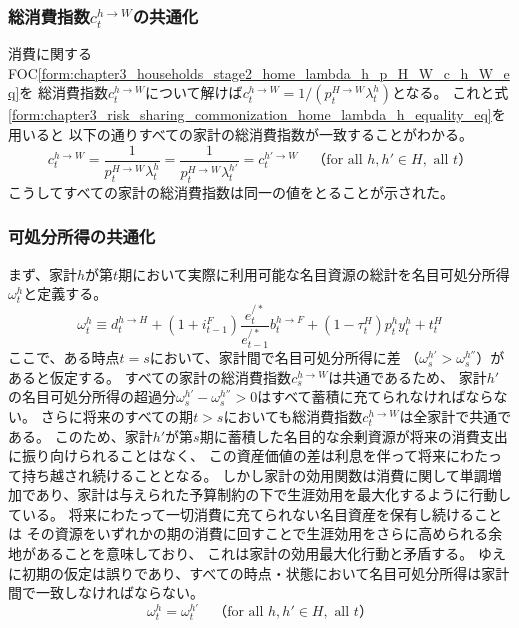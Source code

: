 \subsubsection{総消費指数\(c_t^{h\to W}\)の共通化}
\label{sec:chapter3_risk_sharing_commonization_home_c_h_W}
消費に関するFOC\eqref{form:chapter3_households_stage2_home_lambda_h_p_H_W_c_h_W_eq}を
総消費指数\(c_t^{h\to W}\)について解けば\(c_t^{h\to W}=1/(p_t^{H\to W}\lambda_t^h)\)となる。
これと式\eqref{form:chapter3_risk_sharing_commonization_home_lambda_h_equality_eq}を用いると
以下の通りすべての家計の総消費指数が一致することがわかる。
\begin{equation}
\label{form:chapter3_risk_sharing_commonization_home_c_h_W_equality_eq}
    c_t^{h\to W}
    =\frac{1}{p_t^{H\to W}\lambda_t^h}
    =\frac{1}{p_t^{H\to W}\lambda_t^{h'}}
    =c_t^{h'\to W}
    \quad（\text{for all }h,h'\in H,\text{ all }t）
\end{equation}
こうしてすべての家計の総消費指数は同一の値をとることが示された。

\subsubsection{可処分所得の共通化}
\label{sec:chapter3_risk_sharing_commonization_home_omega_h_equality}
まず、家計\(h\)が第\(t\)期において実際に利用可能な名目資源の総計を名目可処分所得\(\omega_t^h\)と定義する。
\begin{equation}
\label{form:chapter3_risk_sharing_commonization_omega_def}
\omega_t^h\equiv d_t^{h\to H}+(1+i_{t-1}^F)\frac{e_t^{/*}}{e_{t-1}^{/*}}b_t^{h\to F}+(1-\tau_t^H)p_t^hy_t^h+t_t^H
\end{equation}
ここで、ある時点\(t=s\)において、家計間で名目可処分所得に差
（\(\omega_s^{h'}>\omega_s^{h''}\)）があると仮定する。
すべての家計の総消費指数\(c_s^{h\to W}\)は共通であるため、
家計\(h'\)の名目可処分所得の超過分\(\omega_s^{h'}-\omega_s^{h''}>0\)はすべて蓄積に充てられなければならない。
さらに将来のすべての期\(t>s\)においても総消費指数\(c_t^{h\to W}\)は全家計で共通である。
このため、家計\(h'\)が第\(s\)期に蓄積した名目的な余剰資源が将来の消費支出に振り向けられることはなく、
この資産価値の差は利息を伴って将来にわたって持ち越され続けることとなる。
しかし家計の効用関数は消費に関して単調増加であり、家計は与えられた予算制約の下で生涯効用を最大化するように行動している。
将来にわたって一切消費に充てられない名目資産を保有し続けることは
その資源をいずれかの期の消費に回すことで生涯効用をさらに高められる余地があることを意味しており、
これは家計の効用最大化行動と矛盾する。
ゆえに初期の仮定は誤りであり、すべての時点・状態において名目可処分所得は家計間で一致しなければならない。
\begin{equation}
\label{form:chapter3_risk_sharing_commonization_omega_h_equality}
\omega_t^h=\omega_t^{h'}\quad（\text{for all }h,h'\in H,\text{ all }t）
\end{equation}

